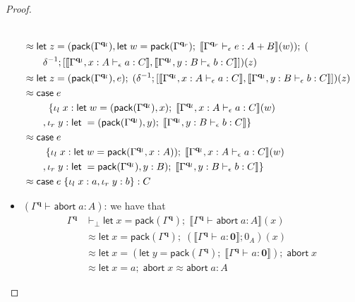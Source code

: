 \documentclass[acmsmall,screen,review]{acmart}
\newcommand{\mb}[1]{\ensuremath{\mathbf{#1}}}
\newcommand{\ms}[1]{\ensuremath{\mathsf{#1}}}
\newcommand{\lto}{:}
\newcommand{\linl}[1]{\iota_l\;{#1}}
\newcommand{\linr}[1]{\iota_r\;{#1}}
\newcommand{\labort}[1]{\ms{abort}\;{#1}}
\newcommand{\letexpr}[3]{\ensuremath{\ms{let}\;#1 = #2;\;#3}}
\newcommand{\caseexpr}[5]{\ms{case}\;#1\;\{\linl{#2} \lto #3, \linr{#4} \lto #5\}}
\newcommand{\hasty}[4]{#1 \vdash_{#2} #3: {#4}}
\newcommand{\dnt}[1]{\llbracket{#1}\rrbracket}
\begin{document}
\begin{proof}
\begin{itemize}
\begin{align*}
      \\ &\approx
      \letexpr{z}{(\ms{pack}(\Gamma^{\mb{q}_l}), 
        \letexpr{w}{\ms{pack}(\Gamma^{\mb{q}_r})}{
          \dnt{\hasty{\Gamma^{\mb{q}_r}}{\epsilon}{e}{A + B}}(w)})}{(  \\ & \qquad
        \delta^{-1}
        ; [
          \dnt{\hasty{\Gamma^{\mb{q}_l}, x : A}{\epsilon}{a}{C}},
          \dnt{\hasty{\Gamma^{\mb{q}_l}, y : B}{\epsilon}{b}{C}}
        ])(z)}
      \\ &\approx
      \letexpr{z}{(\ms{pack}(\Gamma^{\mb{q}_l}), e)}{(
        \delta^{-1}
        ; [
          \dnt{\hasty{\Gamma^{\mb{q}_l}, x : A}{\epsilon}{a}{C}},
          \dnt{\hasty{\Gamma^{\mb{q}_l}, y : B}{\epsilon}{b}{C}}
        ])(z)}
      \\ &\approx
      \caseexpr{e \\ & \qquad\;}
        {x}{\letexpr{w}{(\ms{pack}(\Gamma^{\mb{q}_l}), x)}{
          \dnt{\hasty{\Gamma^{\mb{q}_l}, x : A}{\epsilon}{a}{C}}(w)} \\ & \qquad}
        {y}{\letexpr{}{(\ms{pack}(\Gamma^{\mb{q}_l}), y)}{
          \dnt{\hasty{\Gamma^{\mb{q}_l}, y : B}{\epsilon}{b}{C}}}}
      \\ &\approx
      \caseexpr{e \\ & \qquad}
        {x}{\letexpr{w}{\ms{pack}(\Gamma^{\mb{q}_l}, x : A))}{
          \dnt{\hasty{\Gamma^{\mb{q}_l}, x : A}{\epsilon}{a}{C}}(w)} \\ & \qquad}
        {y}{\letexpr{}{\ms{pack}(\Gamma^{\mb{q}_l}), y : B)}{
          \dnt{\hasty{\Gamma^{\mb{q}_l}, y : B}{\epsilon}{b}{C}}}}
      \\ &\approx
      \caseexpr{e}{x}{a}{y}{b} : C
    \end{align*}
    \item $(\hasty{\Gamma^{\mb{q}}}{}{\labort{a}}{A})$: we have that
    \begin{align*}
    \Gamma^{\mb{q}} &\vdash_\bot
      \letexpr{x}{\ms{pack}(\Gamma^{\mb{q}})}{\dnt{\hasty{\Gamma^{\mb{q}}}{}{\labort{a}}{A}}(x)}
      \\ &\approx 
      \letexpr{x}{\ms{pack}(\Gamma^{\mb{q}})}
        {(\dnt{\hasty{\Gamma^{\mb{q}}}{}{a}{\mb{0}}} ; 0_A)(x)}
      \\ &\approx
      \letexpr{x}{(\letexpr{y}{\ms{pack}(\Gamma^{\mb{q}})}
          {\dnt{\hasty{\Gamma^{\mb{q}}}{}{a}{\mb{0}}}})}
        {\labort{x}} 
      \\ &\approx
      \letexpr{x}{a}{\labort{x}} \approx \labort{a} : A
    \end{align*}

\end{itemize}
\end{proof}
\end{document}
